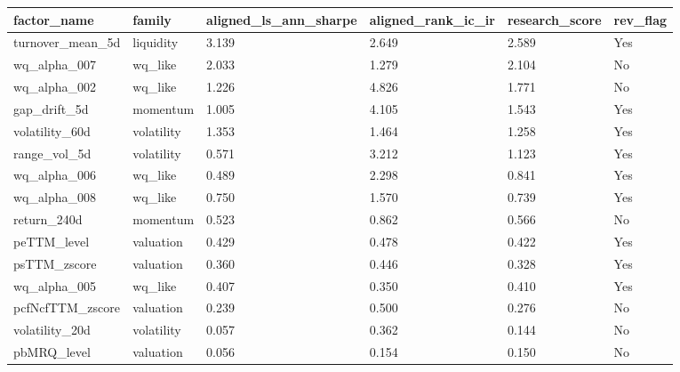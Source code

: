 \begin{tabular}{llllll}
\toprule
factor\_name & family & aligned\_ls\_ann\_sharpe & aligned\_rank\_ic\_ir & research\_score & rev\_flag \\
\midrule
turnover\_mean\_5d & liquidity & 3.139 & 2.649 & 2.589 & Yes \\
wq\_alpha\_007 & wq\_like & 2.033 & 1.279 & 2.104 & No \\
wq\_alpha\_002 & wq\_like & 1.226 & 4.826 & 1.771 & No \\
gap\_drift\_5d & momentum & 1.005 & 4.105 & 1.543 & Yes \\
volatility\_60d & volatility & 1.353 & 1.464 & 1.258 & Yes \\
range\_vol\_5d & volatility & 0.571 & 3.212 & 1.123 & Yes \\
wq\_alpha\_006 & wq\_like & 0.489 & 2.298 & 0.841 & Yes \\
wq\_alpha\_008 & wq\_like & 0.750 & 1.570 & 0.739 & Yes \\
return\_240d & momentum & 0.523 & 0.862 & 0.566 & No \\
peTTM\_level & valuation & 0.429 & 0.478 & 0.422 & Yes \\
psTTM\_zscore & valuation & 0.360 & 0.446 & 0.328 & Yes \\
wq\_alpha\_005 & wq\_like & 0.407 & 0.350 & 0.410 & Yes \\
pcfNcfTTM\_zscore & valuation & 0.239 & 0.500 & 0.276 & No \\
volatility\_20d & volatility & 0.057 & 0.362 & 0.144 & No \\
pbMRQ\_level & valuation & 0.056 & 0.154 & 0.150 & No \\
\bottomrule
\end{tabular}
